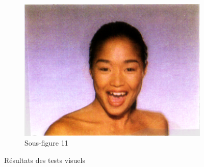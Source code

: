 \begin{figure}[h!]
    \begin{subfigure}{0.45\textwidth}
        \includegraphics[width=\textwidth]{img/testvisuel/frame10.png}
        \caption{Sous-figure 11}
    \end{subfigure}
    \caption{Résultats des tests visuels}
\end{figure}